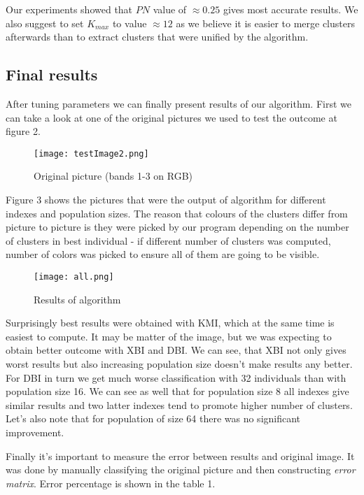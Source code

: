 \documentclass[11pt,leqno]{article}
\theoremstyle{mytheoremstyle}
\theoremstyle{mytheoremstyle}
\begin{document}
Our experiments showed that $PN$ value of $\approx 0.25$ gives most accurate results. We also suggest to set $K_{max}$ to value $\approx 12$ as we believe it is easier to merge clusters afterwards than to extract clusters that were unified by the algorithm.

\subsection{Final results}

After tuning parameters we can finally present results of our algorithm. First we can take a look at one of the original pictures we used to test the outcome at figure 2.

\begin{figure}
\begin{center}
\texttt{[image: testImage2.png]}
\caption{Original picture (bands 1-3 on RGB)}
\end{center}
\end{figure}


Figure 3 shows the pictures that were the output of algorithm for different indexes and population sizes. The reason that colours of the clusters differ from picture to picture is they were picked by our program depending on the number of clusters in best individual - if different number of clusters was computed, number of colors was picked to ensure all of them are going to be visible.


\begin{figure}[h]
\texttt{[image: all.png]}
\caption{Results of algorithm}
\end{figure}

Surprisingly best results were obtained with KMI, which at the same time is easiest to compute. It may be matter of the image, but we was expecting to obtain better outcome with XBI and DBI. We can see, that XBI not only gives worst results but also increasing population size doesn't make results any better. For DBI in turn we get much worse classification with 32 individuals than with population size 16. We can see as well that for population size 8 all indexes give similar results and two latter indexes tend to promote higher number of clusters. Let's also note that for population of size 64 there was no significant improvement.

Finally it's important to measure the error between results and original image. It was done by manually classifying the original picture and then constructing \textit{error matrix}. Error percentage is shown in the table 1.
\end{document}
